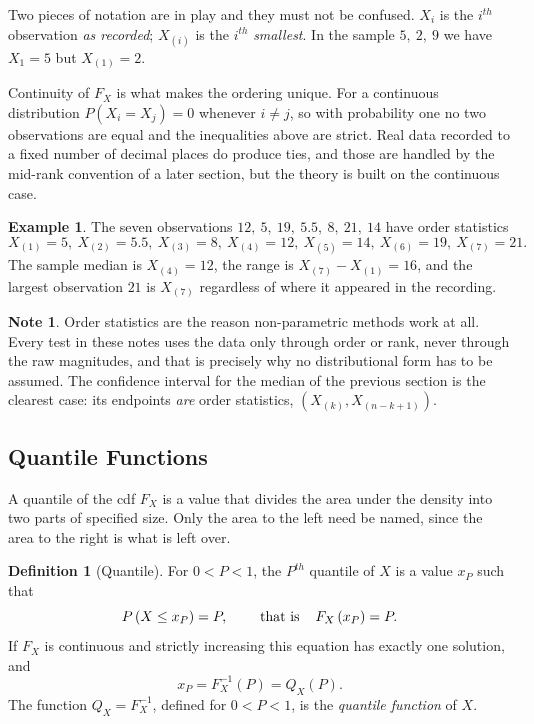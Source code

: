 \documentclass[11pt,a4paper]{article}
\theoremstyle{definition}
\newtheorem{definition}[thm]{Definition}
\newtheorem{example}[thm]{Example}
\newtheorem{note}[thm]{Note}
\begin{document}
Two pieces of notation are in play and they must not be confused. $X_i$ is the
$i^{th}$ observation \emph{as recorded}; $X_{(i)}$ is the $i^{th}$
\emph{smallest}. In the sample $5,\ 2,\ 9$ we have $X_1=5$ but $X_{(1)}=2$.

Continuity of $F_X$ is what makes the ordering unique. For a continuous
distribution $P\left(X_i=X_j\right)=0$ whenever $i\neq j$, so with probability one
no two observations are equal and the inequalities above are strict. Real data
recorded to a fixed number of decimal places do produce ties, and those are
handled by the mid-rank convention of a later section, but the theory is built on
the continuous case.

\begin{example}
The seven observations $12,\ 5,\ 19,\ 5.5,\ 8,\ 21,\ 14$ have order statistics
$$X_{(1)}=5,\ X_{(2)}=5.5,\ X_{(3)}=8,\ X_{(4)}=12,\ X_{(5)}=14,\ X_{(6)}=19,\ X_{(7)}=21 .$$
The sample median is $X_{(4)}=12$, the range is $X_{(7)}-X_{(1)}=16$, and the
largest observation $21$ is $X_{(7)}$ regardless of where it appeared in the
recording.
\end{example}

\begin{note}
Order statistics are the reason non-parametric methods work at all. Every test in
these notes uses the data only through order or rank, never through the raw
magnitudes, and that is precisely why no distributional form has to be assumed.
The confidence interval for the median of the previous section is the clearest
case: its endpoints \emph{are} order statistics, $\left(X_{(k)},X_{(n-k+1)}\right)$.
\end{note}

\pagebreak
\subsection{Quantile Functions}
A quantile of the cdf $F_X$ is a value that divides the area under the density
into two parts of specified size. Only the area to the left need be named, since
the area to the right is what is left over.

\begin{definition}[Quantile]
For $0<P<1$, the $P^{th}$ quantile of $X$ is a value $x_P$ such that
$$P\left(X\leq x_P\right)=P, \hspace{0.8cm}\text{that is}\hspace{0.4cm} F_X\left(x_P\right)=P .$$
If $F_X$ is continuous and strictly increasing this equation has exactly one
solution, and
$$x_P=F_X^{-1}(P)=Q_X(P).$$
The function $Q_X=F_X^{-1}$, defined for $0<P<1$, is the \emph{quantile function}
of $X$.
\end{definition}
\end{document}
